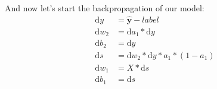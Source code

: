 \documentclass[conference]{IEEEtran}
\begin{document}
    And now let's start the backpropagation of our model:
    \begin{equation}
        \begin{aligned}
            \mathrm{d}y &= \hat{\mathbf{y}} - label \\ 
            \mathrm{d}w_2 &= \mathrm{d}a_1 * \mathrm{d}y \\ 
            \mathrm{d}b_2 &= \mathrm{d}y \\ 
            \mathrm{d}s &= \mathrm{d}w_2 * \mathrm{d}y * a_1 * (1 - a_1) \\ 
            \mathrm{d}w_1 &= X * \mathrm{d}s \\ 
            \mathrm{d}b_1 &= \mathrm{d}s
        \end{aligned}
    \end{equation}
\end{document}
